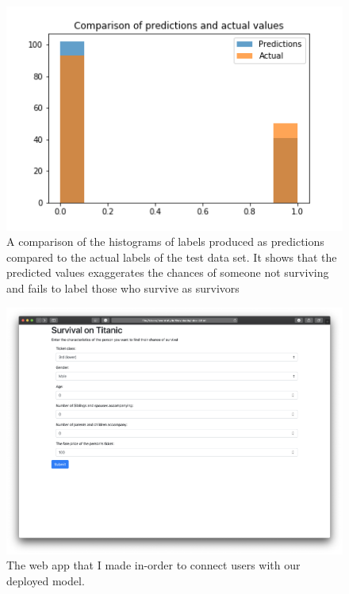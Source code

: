 \documentclass{article}
\begin{document}
\begin{figure}[H]
    \includegraphics[width=\linewidth]{free-form}
    \caption{A comparison of the histograms of labels produced as predictions compared to 
        the actual labels of the test data set. It shows that the predicted values exaggerates
        the chances of someone not surviving and fails to label those who survive as survivors}
    \label{fig: free-form-plot}
\end{figure}

\begin{figure}[H]
    \includegraphics[width=\linewidth]{web_app}
    \caption{The web app that I made in-order to connect users with our deployed model.}
    \label{fig: free-form-plot}
\end{figure}
\end{document}
